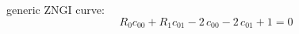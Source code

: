 \documentclass{article}
\begin{document}
generic ZNGI curve:
\[R_{0} c_{00} + R_{1} c_{01} - 2 \, c_{00} - 2 \, c_{01} + 1 = 0\]
\end{document}
